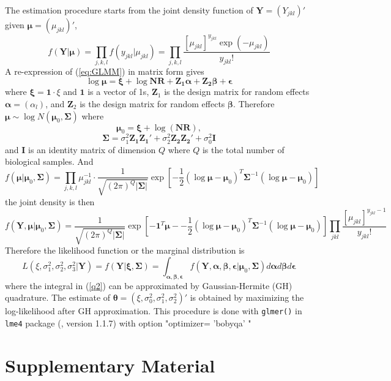\documentclass[11pt, a4paper]{article}
\begin{document}
The estimation procedure starts from the joint density function of $\bm Y=(Y_{jkl})'$ given $\bm \mu= (\mu_{jkl})'$, 
\[f(\bm Y|\bm \mu )=\prod_{ j, k,l}f(y_{jkl}|\mu_{jkl})=\prod_{j,k,l}\frac{[\mu_{jkl}]^{y_{jkl}}\exp(-\mu_{jkl})}{y_{jkl}!}\]
A re-expression of  (\ref{eq:GLMM}) in matrix form gives 
\[\log\bm \mu= \bm \xi + \log{\bm{NR}} + \bm {Z_1\alpha} + \bm{Z_2\beta} + \bm \epsilon \]
where $\bm \xi = \bm 1\cdot\xi$ and $\bm 1$ is a vector of 1s, $\bm Z_1$ is the design matrix for random effects $\bm \alpha=(\alpha_l)$, and $\bm Z_2$ is the design matrix for random effects $\bm \beta $. 
Therefore  $\bm\mu  \sim \log N(\bm \mu_0, \bm \Sigma)$ where 
$$\bm \mu_0 =\bm\xi + \log(\bm {NR}),$$ 
$$\bm \Sigma = \sigma_1^2\bm {Z_1Z_1'} + \sigma_2^2\bm {Z_2 Z_2'} +\sigma_0^2 \bm I$$
and $\bm I$ is an identity matrix of dimension $Q$ where $Q$ is the total number of biological samples. 
And 
\[f(\bm \mu |\bm \mu_0, \bm \Sigma)=\prod_{j,k,l} \mu_{jkl}^{-1}\cdot \frac{1}{ \sqrt{(2\pi)^Q|\bm\Sigma|}}\exp[-\frac{1}{2} {(\log\bm \mu - \bm \mu_0)^T\bm \Sigma^{-1}(\log\bm \mu - \bm \mu_0)}]\]
the joint density is then
\[f(\bm Y, \bm \mu |\bm \mu_0, \bm \Sigma) =\frac{1}{\sqrt{(2\pi)^Q|\bm \Sigma|}}\exp[-\bm 1^T\bm \mu - -\frac{1}{2} {(\log\bm \mu - \bm \mu_0)^T\bm \Sigma^{-1}(\log\bm \mu - \bm \mu_0)}]\prod_{jkl}\frac{[\mu_{jkl}]^{y_{jkl}-1}}{y_{jkl}!}\]
Therefore the likelihood function or the marginal distribution is 
\begin{equation}\label{q2}
L(\xi, \sigma_1^2, \sigma_2^2, \sigma_3^2|\bm Y)=f(\bm Y|\bm \xi, \bm \Sigma)= \int_{\bm{\alpha,\beta,\epsilon}} f(\bm Y, \bm \alpha, \bm \beta, \bm \epsilon |\bm \mu_0, \bm \Sigma)d\bm \alpha d \bm\beta d\bm \epsilon 
\end{equation}
where the integral in (\ref{q2}) can be approximated by Gaussian-Hermite (GH) quadrature. The estimate of $\bm\theta = (\xi, \sigma_0^2, \sigma_1^2, \sigma_2^2)'$ is obtained by maximizing the log-likelihood after GH approximation.  This procedure is done with \verb"glmer()"  in \verb"lme4"  package (\cite{bates2012lme4}, version 1.1.7)  with option  "optimizer= 'bobyqa' " 


\section{Supplementary Material}
\end{document}
